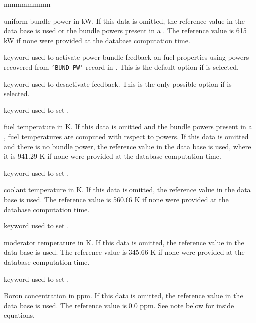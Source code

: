 \begin{ListeDeDescription}{mmmmmmmm}
\item[\dusa{pow}] uniform bundle power in kW. If this data is omitted, the
reference value in the data base is used or the bundle powers present
in a . The reference value is 615 kW if none were provided at the
database computation time.

\item[\moc{PWF}] keyword used to activate power bundle feedback on fuel properties using powers
recovered from {\tt 'BUND-PW'} record in . This is the default option
if  is selected.

\item[\moc{NPWF}] keyword used to desactivate  feedback. This is the only possible option
if  is selected.

\item[\moc{TFUEL}] keyword used to set .

\item[\dusa{tfuel}] fuel temperature in K. If this data is omitted and
the bundle powers present in a , fuel temperatures are 
computed with respect to powers.
If this data is omitted and there is no bundle power, the
reference value in the data base is used, where it is 941.29 K if none were provided at the database computation time.

\item[\moc{TCOOL}] keyword used to set .

\item[\dusa{tcool}] coolant temperature in K. If this data is omitted, the
reference value in the data base is used. The reference value is 560.66 K if none were provided at the database computation time.

\item[\moc{TMOD}] keyword used to set .

\item[\dusa{tmod}] moderator temperature in K. If this data is omitted, the
reference value in the data base is used. The reference value is 345.66 K if none were provided at the database computation time.

\item[\moc{BORON}] keyword used to set .

\item[\dusa{nB}] Boron concentration in ppm. If this data is omitted, the
reference value in the data base is used. The reference value is 0.0 ppm. See note below for inside equations.


\end{ListeDeDescription}

